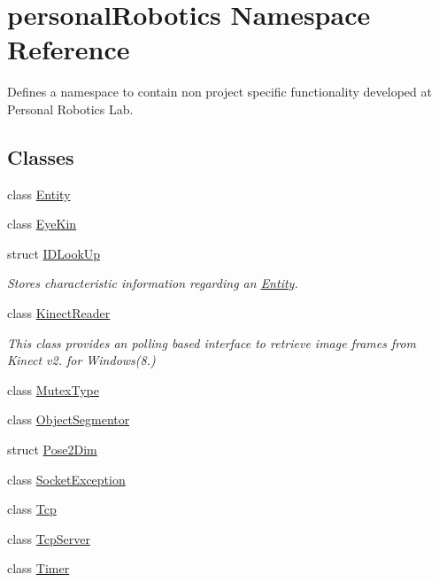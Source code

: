 \hypertarget{namespacepersonal_robotics}{}\section{personal\+Robotics Namespace Reference}
\label{namespacepersonal_robotics}


Defines a namespace to contain non project specific functionality developed at Personal Robotics Lab.  


\subsection*{Classes}
\begin{DoxyCompactItemize}
\item 
class \hyperlink{classpersonal_robotics_1_1_entity}{Entity}
\item 
class \hyperlink{classpersonal_robotics_1_1_eye_kin}{Eye\+Kin}
\item 
struct \hyperlink{structpersonal_robotics_1_1_i_d_look_up}{I\+D\+Look\+Up}
\begin{DoxyCompactList}\small\item\em Stores characteristic information regarding an \hyperlink{classpersonal_robotics_1_1_entity}{Entity}. \end{DoxyCompactList}\item 
class \hyperlink{classpersonal_robotics_1_1_kinect_reader}{Kinect\+Reader}
\begin{DoxyCompactList}\small\item\em This class provides an polling based interface to retrieve image frames from Kinect v2. for Windows(8.) \end{DoxyCompactList}\item 
class \hyperlink{classpersonal_robotics_1_1_mutex_type}{Mutex\+Type}
\item 
class \hyperlink{classpersonal_robotics_1_1_object_segmentor}{Object\+Segmentor}
\item 
struct \hyperlink{structpersonal_robotics_1_1_pose2_dim}{Pose2\+Dim}
\item 
class \hyperlink{classpersonal_robotics_1_1_socket_exception}{Socket\+Exception}
\item 
class \hyperlink{classpersonal_robotics_1_1_tcp}{Tcp}
\item 
class \hyperlink{classpersonal_robotics_1_1_tcp_server}{Tcp\+Server}
\item 
class \hyperlink{classpersonal_robotics_1_1_timer}{Timer}
\end{DoxyCompactItemize}
